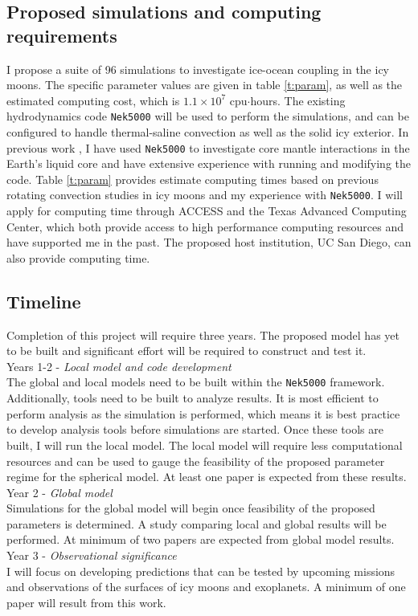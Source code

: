 \documentclass[12pt]{article}
\begin{document}
\subsection{Proposed simulations and computing requirements}
I propose a suite of 96 simulations to investigate ice-ocean coupling in the icy moons. The specific parameter values are given in table \ref{t:param}, as well as the estimated computing cost, which is $1.1\times 10^{7}$ cpu$\cdot$hours.  The existing hydrodynamics code \texttt{Nek5000} \citep{nek5000} will be used to perform the simulations, and can be configured to handle thermal-saline convection as well as the solid icy exterior.
In previous work \citep{tO25}, I have used \texttt{Nek5000} to investigate core mantle interactions in the Earth's liquid core and have extensive experience with running and modifying the code. Table \ref{t:param} provides estimate computing times based on previous rotating convection studies in icy moons \citep{dL23} and my experience with \texttt{Nek5000}.
 I will apply for computing time through ACCESS and the Texas Advanced Computing Center, which both provide access to high performance computing resources and have supported me in the past. The proposed host institution, UC San Diego, can also provide computing time.
 \subsection{Timeline}
 Completion of this project will require three years. The proposed model has yet to be built and significant effort will be required to construct and test it.\\
 Years 1-2 - \textit{Local model and code development}\\
 The global and local models need to be built within the \texttt{Nek5000} framework. Additionally, tools need to be built to analyze results. It is most efficient to perform analysis as the simulation is performed, which means it is best practice to develop analysis tools before simulations are started. Once these tools are built, I will run the local model.
 The local model will require less computational resources and can be used to gauge the feasibility of the proposed parameter regime for the spherical model. At least one paper is expected from these results.\\
 Year 2 - \textit{Global model}\\
  Simulations for the global model will begin once feasibility of the proposed parameters is determined. A study comparing local and global results will be performed. At minimum of two papers are expected from global model results. \\
 Year 3 -  \textit{Observational significance}\\ I will focus on developing predictions that can be tested by upcoming missions and observations of the surfaces of icy moons and exoplanets. A minimum of one paper will result from this work.
\end{document}
